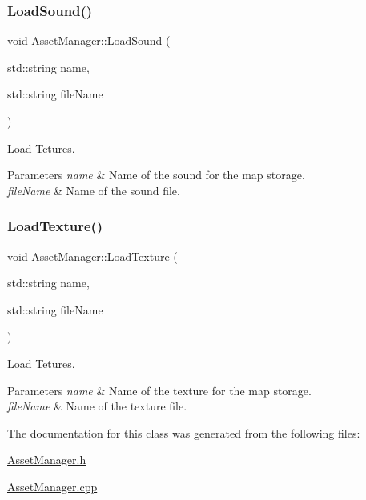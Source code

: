 \subsubsection{\texorpdfstring{Load\+Sound()}{LoadSound()}}
{\footnotesize\ttfamily void Asset\+Manager\+::\+Load\+Sound (\begin{DoxyParamCaption}\item[{std\+::string}]{name,  }\item[{std\+::string}]{file\+Name }\end{DoxyParamCaption})}



Load Tetures. 


\begin{DoxyParams}{Parameters}
{\em name} & Name of the sound for the map storage. \\
\hline
{\em file\+Name} & Name of the sound file. \\
\hline
\end{DoxyParams}
\mbox{\label{classAssetManager_ada0c8171d6f0224c261080c04d954538}} 
\subsubsection{\texorpdfstring{Load\+Texture()}{LoadTexture()}}
{\footnotesize\ttfamily void Asset\+Manager\+::\+Load\+Texture (\begin{DoxyParamCaption}\item[{std\+::string}]{name,  }\item[{std\+::string}]{file\+Name }\end{DoxyParamCaption})}



Load Tetures. 


\begin{DoxyParams}{Parameters}
{\em name} & Name of the texture for the map storage. \\
\hline
{\em file\+Name} & Name of the texture file. \\
\hline
\end{DoxyParams}


The documentation for this class was generated from the following files\+:\begin{DoxyCompactItemize}
\item 
\mbox{\hyperlink{AssetManager_8h}{Asset\+Manager.\+h}}\item 
\mbox{\hyperlink{AssetManager_8cpp}{Asset\+Manager.\+cpp}}\end{DoxyCompactItemize}

